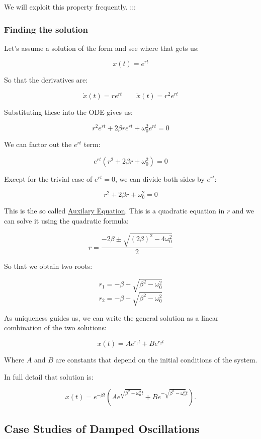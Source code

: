 \documentclass[11pt]{article}
\begin{document}
We will exploit this property frequently. :::

\subsubsection{Finding the solution}\label{finding-the-solution}

Let's assume a solution of the form and see where that gets us:

\[x(t) = e^{r t}\]

So that the derivatives are:

\[\dot{x}(t) = r e^{r t} \qquad \ddot{x}(t) = r^2 e^{r t}\]

Substituting these into the ODE gives us:

\[r^2 e^{r t} + 2\beta r e^{r t} + \omega_0^2 e^{r t} = 0\]

We can factor out the \(e^{r t}\) term:

\[e^{r t} \left(r^2 + 2\beta r + \omega_0^2\right) = 0\]

Except for the trivial case of \(e^{r t} = 0\), we can divide both sides
by \(e^{r t}\):

\[r^2 + 2\beta r + \omega_0^2 = 0\]

This is the so called
\href{https://en.wikipedia.org/wiki/Auxiliary_equation}{Auxilary
Equation}. This is a quadratic equation in \(r\) and we can solve it
using the quadratic formula:

\[r = \dfrac{-2\beta \pm \sqrt{(2\beta)^2 - 4\omega_0^2}}{2}\]

So that we obtain two roots:

\[r_1 = -\beta + \sqrt{\beta^2 - \omega_0^2}\]
\[r_2 = -\beta - \sqrt{\beta^2 - \omega_0^2}\]

As uniqueness guides us, we can write the general solution as a linear
combination of the two solutions:

\[x(t) = A e^{r_1 t} + B e^{r_2 t}\]

Where \(A\) and \(B\) are constants that depend on the initial
conditions of the system.

In full detail that solution is:

\[x(t) = e^{-\beta t}\left(A e^{\sqrt{\beta^2 - \omega_0^2} t} + B e^{-\sqrt{\beta^2 - \omega_0^2} t}\right).\]

    \subsection{Case Studies of Damped
Oscillations}\label{case-studies-of-damped-oscillations}
\end{document}
